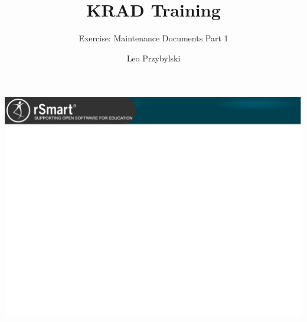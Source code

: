\documentclass[xcolor=dvipsnames,14pt,professionalfonts]{beamer}
\begin{document}
\title{KRAD Training}
\subtitle{Exercise: Maintenance Documents Part 1}
\author[Leo]{Leo Przybylski}

\usebackgroundtemplate%
{%
    \includegraphics[width=\paperwidth,height=\paperheight]{../img/header.png}%
}

{
%
\begin{frame}[plain]
  \titlepage
\end{frame}
}
\end{document}

